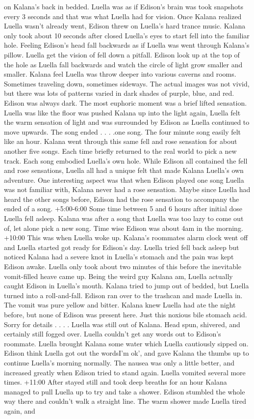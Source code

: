 \documentclass[12pt]{book}
\begin{document}
on Kalana's back in bedded. Luella was as if Edison's brain was took snapshots every 3 seconds and that was what Luella had for vision. Once Kalana realized Luella wasn't already went, Edison threw on Luella's hard trance music. Kalana only took about 10 seconds after closed Luella's eyes to start fell into the familiar hole. Feeling Edison's head fall backwards as if Luella was went through Kalana's pillow. Luella get the vision of fell down a pitfall. Edison look up at the top of the hole as Luella fall backwards and watch the circle of light grow smaller and smaller. Kalana feel Luella was throw deeper into various caverns and rooms. Sometimes traveling down, sometimes sideways. The actual images was not vivid, but there was lots of patterns varied in dark shades of purple, blue, and red. Edison was always dark. The most euphoric moment was a brief lifted sensation. Luella was like the floor was pushed Kalana up into the light again, Luella felt the warm sensation of light and was surrounded by Edison as Luella continued to move upwards. The song ended . . .  .one song. The four minute song easily felt like an hour. Kalana went through this same fell and rose sensation for about another five songs. Each time briefly returned to the real world to pick a new track. Each song embodied Luella's own hole. While Edison all contained the fell and rose sensations, Luella all had a unique felt that made Kalana Luella's own adventure. One interesting aspect was that when Edison played one song Luella was not familiar with, Kalana never had a rose sensation. Maybe since Luella had heard the other songs before, Edison had the rose sensation to accompany the ended of a song. +5:00-6:00 Some time between 5 and 6 hours after initial dose Luella fell asleep. Kalana was after a song that Luella was too lazy to come out of, let alone pick a new song. Time wise Edison was about 4am in the morning. +10:00 This was when Luella woke up. Kalana's roommates alarm clock went off and Luella started got ready for Edison's day. Luella tried fell back asleep but noticed Kalana had a severe knot in Luella's stomach and the pain was kept Edison awake. Luella only took about two minutes of this before the inevitable vomit-filled heave came up. Being the weird guy Kalana am, Luella actually caught Edison in Luella's mouth. Kalana tried to jump out of bedded, but Luella turned into a roll-and-fall. Edison ran over to the trashcan and made Luella in. The vomit was pure yellow and bitter. Kalana knew Luella had ate the night before, but none of Edison was present here. Just this noxious bile stomach acid. Sorry for details . . .  . Luella was still out of Kalana. Head spun, shivered, and certainly still fogged over. Luella couldn't get any words out to Edison's roommate. Luella brought Kalana some water which Luella cautiously sipped on. Edison think Luella got out the wordsI'm ok', and gave Kalana the thumbs up to continue Luella's morning normally. The nausea was only a little better, and increased greatly when Edison tried to stand again. Luella vomited several more times. +11:00 After stayed still and took deep breaths for an hour Kalana managed to pull Luella up to try and take a shower. Edison stumbled the whole way there and couldn't walk a straight line. The warm shower made Luella tired again, and 
\end{document}
